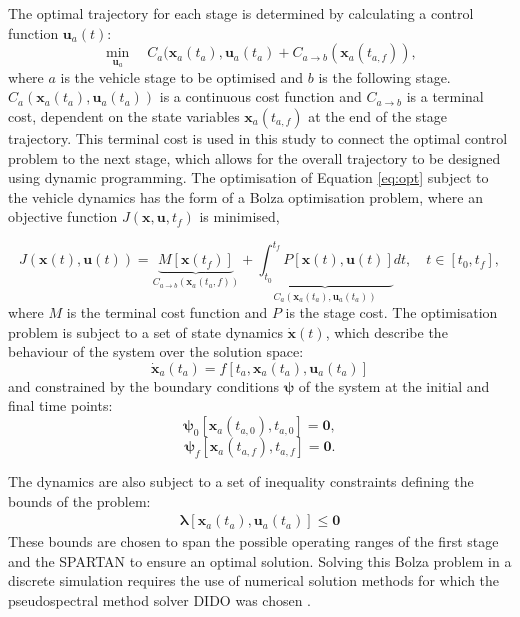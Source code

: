 \documentclass[]{aiaa-tc}
\begin{document}
 The optimal trajectory for each stage is determined by calculating a control function $\textbf{u}_a(t)$:
\begin{equation} \label{eq:opt}
\min\limits_{\textbf{u}_a} \quad C_a(\textbf{x}_a(t_a),\textbf{u}_a(t_a) + C_{a\rightarrow  b}(\textbf{x}_a(t_{a,f})),
\end{equation}
where $a$ is the vehicle stage to be optimised and $b$ is the following stage. $ C_a(\textbf{x}_a(t_a),\textbf{u}_a(t_a))$ is a continuous cost function and $C_{{a\rightarrow b}}$ is a terminal cost, dependent on the state variables $\textbf{x}_a(t_{a,f})$ at the end of the stage trajectory. This terminal cost is used in this study to connect the optimal control problem to the next stage, which allows for the overall trajectory to be designed using dynamic programming.
The optimisation of Equation \ref{eq:opt} subject to the vehicle dynamics has the form of a Bolza optimisation problem, where an objective function $J(\textbf{x},\textbf{u},t_f)$ is minimised,

\begin{equation} \label{eq:cost}
J(\textbf{x}(t),\textbf{u}(t)) = \underbrace{M[\textbf{x}(t_f)]}_{C_{a\rightarrow  b}(\textbf{x}_a(t_a,{f}))} +   \underbrace{\int_{t_0}^{t_f} P[\textbf{x}(t),\textbf{u}(t)]}_{ C_a(\textbf{x}_a(t_a),\textbf{u}_a(t_a))} dt, \quad t \in [t_0,t_f],
\end{equation}
where $M$ is the terminal cost function and $P$ is the stage cost. The optimisation problem is subject to a set of state dynamics $\dot{\textbf{x}}(t)$, which describe the behaviour of the system over the solution space: 
\begin{equation} \label{eq:state}
\dot{\textbf{x}}_a(t_a) = f[t_a,\textbf{x}_a(t_a),\textbf{u}_a(t_a)]
\end{equation}
and constrained by the boundary conditions $\bm{\psi}$ of the system at the initial and final time points:
\begin{equation}
\bm{\psi}_0[\textbf{x}_a(t_{a,0}), t_{a,0}] = \textbf{0},
\end{equation}
\begin{equation} \label{eq:2}
\bm{\psi}_f[\textbf{x}_a(t_{a,f}), t_{a,f}] = \textbf{0}.
\end{equation}

The dynamics are also subject to a set of inequality constraints defining the bounds of the problem:
\begin{eqnarray}
\bm{\lambda}[\textbf{x}_a(t_a),\textbf{u}_a(t_a)] \leq \textbf{0}
\end{eqnarray}
 These bounds are chosen to span the possible operating ranges of the first stage and the SPARTAN to ensure an optimal solution. 
 Solving this Bolza problem in a discrete simulation requires the use of numerical solution methods for which the pseudospectral method solver DIDO was chosen \cite{Ross}.
 
\end{document}
